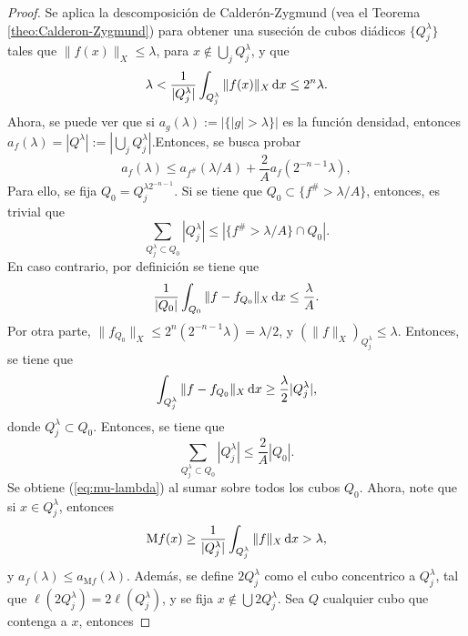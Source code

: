 \begin{proof}
	Se aplica la descomposición de Calderón-Zygmund (vea el Teorema \ref{theo:Calderon-Zygmund}) para obtener una suseción de cubos diádicos $\{Q_j^\lambda\}$ tales que $\|f(x)\|_X \leq \lambda$, para $x\notin\bigcup_j Q_j^\lambda$, y que 
	\begin{equation*}
		\lambda < \frac{1}{|Q_j^\lambda|} \int_{Q_j^\lambda} \|f(x)\|_X\mathop{}\!\mathrm{d} x \leq 2^n\lambda.
	\end{equation*}
	Ahora, se puede ver que si $a_g(\lambda) := |\{|g|>\lambda\}|$ es la función densidad, entonces $a_{f}(\lambda) = |Q^\lambda| := \left|\bigcup_j Q_j^\lambda \right|$.Entonces, se busca probar
	\begin{equation}\label{eq:mu-lambda}
		a_{f}(\lambda) \leq a_{f^\#}(\lambda/A) + \frac{2}{A}a_{f}(2^{-n-1}\lambda),
	\end{equation}
	Para ello, se fija $Q_0 = Q_j^{\lambda2^{-n-1}}$. Si se tiene que $Q_0 \subset\{f^\#>\lambda/A\}$, entonces, es trivial que 
	\begin{equation*}
		\sum_{Q_j^\lambda \subset Q_0} |Q_j^\lambda| \leq |\{f^\# > \lambda/A\}\cap Q_0|.
	\end{equation*}
	En caso contrario, por definición se tiene que 
	\begin{equation*}
		\frac{1}{|Q_0|} \int_{Q_0} \|f - f_{Q_0}\|_X \mathop{}\!\mathrm{d} x \leq \frac{\lambda}{A}.
	\end{equation*}
	Por otra parte, $\|f_{Q_0}\|_X \leq 2^n(2^{-n-1}\lambda) = \lambda/2$, y $(\|f\|_X)_{Q_j^\lambda} \leq \lambda$. Entonces, se tiene que 
	\begin{equation*}
		\int_{Q_j^\lambda} \|f - f_{Q_0}\|_X \mathop{}\!\mathrm{d} x \geq \frac{\lambda}{2} |Q_j^\lambda|,
	\end{equation*}
	donde $Q_j^\lambda\subset Q_0$. Entonces, se tiene que 
	\begin{equation*}
		\sum_{Q_j^\lambda\subset Q_0} |Q_j^\lambda| \leq \frac{2}{A}|Q_0|.
	\end{equation*}
	Se obtiene (\ref{eq:mu-lambda}) al sumar sobre todos los cubos $Q_0$. Ahora, note que si $x\in Q_j^\lambda$, entonces 
	\begin{equation*}
		\mathrm{M}f(x) \geq \frac{1}{|Q_j^\lambda|} \int_{Q_j^\lambda} \|f\|_X\mathop{}\!\mathrm{d} x > \lambda,
	\end{equation*}
	y $a_{f}(\lambda) \leq a_{\mathrm{M}f}(\lambda)$. Además, se define $2Q_j^\lambda$ como el cubo concentrico a $Q_j^\lambda$, tal que $\ell(2Q_j^\lambda) = 2\ell(Q_j^\lambda)$, y se fija $x\notin\bigcup 2Q_j^\lambda$. Sea $Q$ cualquier cubo que contenga a $x$, entonces

\end{proof}

